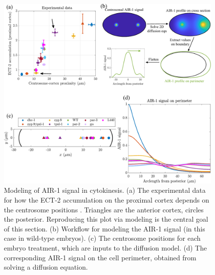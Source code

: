\documentclass[11pt]{article}
\begin{document}
\begin{figure}
\centering
\includegraphics[width=\textwidth]{Glotzer/Fig2/Fig2-crop.pdf}
\caption{\label{fig:CytoSit} Modeling of AIR-1 signal in cytokinesis. (a) The experimental data for how the ECT-2 accumulation on the proximal cortex depends on the centrosome positions \cite[Fig.~7A]{longhini2022aurora}. Triangles are the anterior cortex, circles the posterior. Reproducing this plot via modeling is the central goal of this section. (b) Workflow for modeling the AIR-1 signal (in this case in wild-type embryos). (c) The centrosome positions for each embryo treatment, which are inputs to the diffusion model. (d) The corresponding AIR-1 signal on the cell perimeter, obtained from solving a diffusion equation. }
\end{figure}
\end{document}
